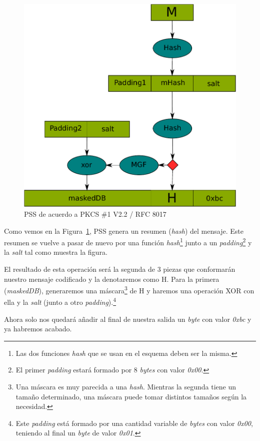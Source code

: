 \begin{figure}[ht]
  \centering
  \includegraphics[scale=0.6]{Figures/PSS}
  \decoRule
  \caption[PSS (Esquema)]{PSS de acuerdo a PKCS \#1 V2.2 / RFC 8017}
  \label{fig:PSS}
\end{figure}

Como vemos en la Figura~\ref{fig:PSS}, PSS genera un resumen (\emph{hash}) del mensaje. Este resumen se vuelve a pasar de nuevo por una función \emph{hash}\footnote{Las dos funciones \emph{hash} que se usan en el esquema deben ser la misma.} junto a un \emph{padding}\footnote{El primer \emph{padding} estará formado por 8 \emph{bytes} con valor \emph{0x00}.} y la \emph{salt} tal como muestra la figura.

El resultado de esta operación será la segunda de 3 piezas que conformarán nuestro mensaje codificado y la denotaremos como H. Para la primera (\emph{maskedDB}), generaremos una máscara\footnote{Una máscara es muy parecida a una \emph{hash}. Mientras la segunda tiene un tamaño determinado, una máscara puede tomar distintos tamaños según la necesidad.} de H y haremos una operación XOR con ella y la \emph{salt} (junto a otro \emph{padding}).\footnote{Este \emph{padding} está formado por una cantidad variable de \emph{bytes} con valor \emph{0x00}, teniendo al final un \emph{byte} de valor \emph{0x01}.}

Ahora solo nos quedará añadir al final de nuestra salida un \emph{byte} con valor \emph{0xbc} y ya habremos acabado. \emph{\parencite{Reference17}}

